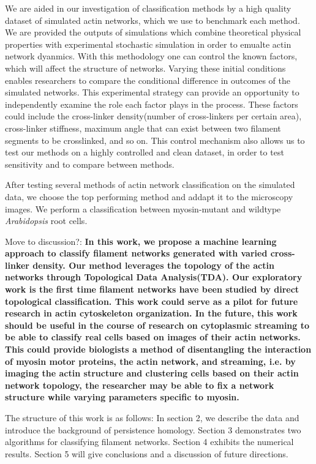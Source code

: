 \documentclass[10pt]{article}
\begin{document}
We are aided in our investigation of classification methods by a high quality dataset of simulated actin networks, which we use to benchmark each method. We are provided the outputs of simulations which combine theoretical physical properties with experimental stochastic simulation in order to emualte actin network dyanmics. With this methodology one can control the known factors, which will affect the structure of networks. Varying these initial conditions enables researchers to compare the conditional difference in outcomes of the simulated networks. This experimental strategy can provide an opportunity to independently examine the role each factor plays in the process. These factors could include the cross-linker density(number of cross-linkers per certain area), cross-linker stiffness, maximum angle that can exist between two filament segments to be crosslinked, and so on\cite{freedman2017versatile,freedman2018nonequilibrium}. This control mechanism also allows us to test our methods on a highly controlled and clean dataset, in order to test sensitivity and to compare between methods.

After testing several methods of actin network classification on the simulated data, we choose the top performing method and addapt it to the microscopy images. We perform a classification between myosin-mutant and wildtype \textit{Arabidopsis} root cells.


Move to discussion?:
\textbf{In this work, we propose a machine learning approach to classify filament networks generated with varied cross-linker density. Our method leverages the topology of the actin networks through Topological Data Analysis(TDA). Our exploratory work is the first time filament networks have been studied by direct topological classification. This work could serve as a pilot for future research in actin cytoskeleton organization. In the future, this work should be useful in the course of research on cytoplasmic streaming to be able to classify real cells based on images of their actin networks. This could provide biologists a method of disentangling the interaction of myosin motor proteins, the actin network, and streaming, i.e. by imaging the actin structure and clustering cells based on their actin network topology, the researcher may be able to fix a network structure while varying parameters specific to myosin.
}


The structure of this work is as follows: In section 2, we describe the data and introduce the background of persistence homology. Section 3 demonstrates two algorithms for classifying filament networks. Section 4 exhibits the numerical results. Section 5 will give conclusions and a discussion of future directions.
\end{document}
